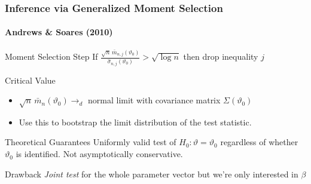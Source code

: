 \documentclass{beamer}
\begin{document}
\begin{frame}
  \frametitle{Inference via Generalized Moment Selection}
  \framesubtitle{Andrews \& Soares (2010)}

  \small

  \begin{block}{Moment Selection Step}
    If $\displaystyle\frac{\sqrt{n}\,\bar{m}_{n,j}(\vartheta_0)}{\widehat{\sigma}_{n,j}(\vartheta_0)} > \sqrt{\log n}$ then drop inequality $j$
  \end{block}

  \begin{block}{Critical Value} 
    \begin{itemize}
      \item $\sqrt{n}\, \bar{m}_n(\vartheta_0) \rightarrow_d$ normal limit with covariance matrix $\Sigma(\vartheta_0)$
      \item Use this to bootstrap the limit distribution of the test statistic.
    \end{itemize}
  \end{block}

  \begin{block}{Theoretical Guarantees}
    Uniformly valid test of $H_0\colon \vartheta = \vartheta_0$ \alert{regardless of whether $\vartheta_0$ is identified}.
    Not asymptotically conservative.
  \end{block}

  \begin{block}{Drawback}
   \emph{Joint test} for the whole parameter vector but we're only interested in $\beta$
  \end{block}

\end{frame}
%
\end{document}
